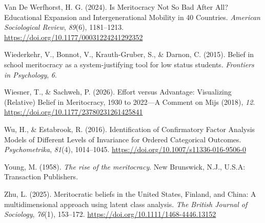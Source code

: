 \documentclass[
  13pt,
]{article}
\newlength{\cslhangindent}
\newenvironment{CSLReferences}[2] %
 {\begin{list}{}{%
  \setlength{\itemindent}{0pt}
  \setlength{\leftmargin}{0pt}
  \setlength{\parsep}{0pt}
  \ifodd #1
   \setlength{\leftmargin}{\cslhangindent}
   \setlength{\itemindent}{-1\cslhangindent}
  \fi
  \setlength{\itemsep}{#2\baselineskip}}}
 {\end{list}}
\begin{document}
\begin{CSLReferences}{1}{0}
Van De Werfhorst, H. G. (2024). Is {Meritocracy Not So Bad After All}?
{Educational Expansion} and {Intergenerational Mobility} in 40
{Countries}. \emph{American Sociological Review}, \emph{89}(6),
1181--1213. \url{https://doi.org/10.1177/00031224241292352}

Wiederkehr, V., Bonnot, V., Krauth-Gruber, S., \& Darnon, C. (2015).
Belief in school meritocracy as a system-justifying tool for low status
students. \emph{Frontiers in Psychology}, \emph{6}.

Wiesner, T., \& Sachweh, P. (2026). Effort versus {Advantage}:
{Visualizing} ({Relative}) {Belief} in {Meritocracy}, 1930 to 2022---{A
Comment} on {Mijs} (2018), \emph{12}.
\url{https://doi.org/10.1177/23780231261425841}

Wu, H., \& Estabrook, R. (2016). Identification of {Confirmatory Factor
Analysis Models} of {Different Levels} of {Invariance} for {Ordered
Categorical Outcomes}. \emph{Psychometrika}, \emph{81}(4), 1014--1045.
\url{https://doi.org/10.1007/s11336-016-9506-0}

Young, M. (1958). \emph{The rise of the meritocracy}. New Brunswick,
N.J., U.S.A: Transaction Publishers.

Zhu, L. (2025). Meritocratic beliefs in the {United States}, {Finland},
and {China}: {A} multidimensional approach using latent class analysis.
\emph{The British Journal of Sociology}, \emph{76}(1), 153--172.
\url{https://doi.org/10.1111/1468-4446.13152}

\end{CSLReferences}
\end{document}
